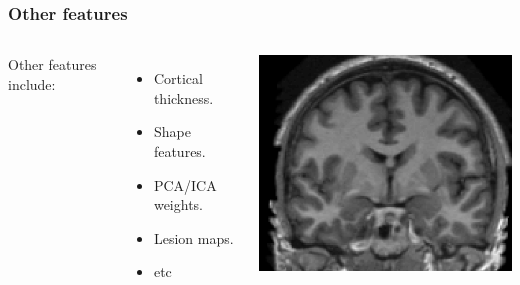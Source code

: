 \begin{frame}
\frametitle{Other features}
\begin{columns}[c]
Other features include:
\begin{itemize}
\item Cortical thickness.
\item Shape features.
\item PCA/ICA weights.
\item Lesion maps.
\item etc
\end{itemize}
\includegraphics[width=\textwidth]{brain-raw}
\end{columns}
\end{frame}

